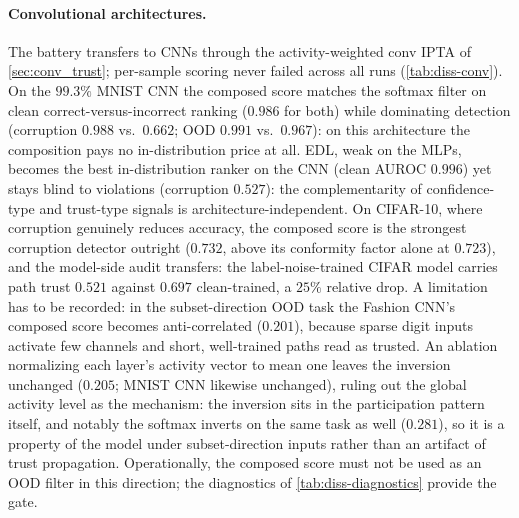 \paragraph*{Convolutional architectures.}
The battery transfers to \acp{CNN} through the activity-weighted conv \ac{IPTA} of \cref{sec:conv_trust}; per-sample scoring never failed across all runs (\cref{tab:diss-conv}). On the $99.3\%$ MNIST \ac{CNN} the composed score matches the softmax filter on clean correct-versus-incorrect ranking ($0.986$ for both) while dominating detection (corruption $0.988$ vs.\ $0.662$; \ac{OOD} $0.991$ vs.\ $0.967$): on this architecture the composition pays no in-distribution price at all. \ac{EDL}, weak on the MLPs, becomes the best in-distribution ranker on the \ac{CNN} (clean AUROC $0.996$) yet stays blind to violations (corruption $0.527$): the complementarity of confidence-type and trust-type signals is architecture-independent. On CIFAR-10, where corruption genuinely reduces accuracy, the composed score is the strongest corruption detector outright ($0.732$, above its conformity factor alone at $0.723$), and the model-side audit transfers: the label-noise-trained CIFAR model carries path trust $0.521$ against $0.697$ clean-trained, a $25\%$ relative drop. A limitation has to be recorded: in the subset-direction \ac{OOD} task the Fashion \ac{CNN}'s composed score becomes anti-correlated ($0.201$), because sparse digit inputs activate few channels and short, well-trained paths read as trusted. An ablation normalizing each layer's activity vector to mean one leaves the inversion unchanged ($0.205$; MNIST \ac{CNN} likewise unchanged), ruling out the global activity level as the mechanism: the inversion sits in the participation pattern itself, and notably the softmax inverts on the same task as well ($0.281$), so it is a property of the model under subset-direction inputs rather than an artifact of trust propagation. Operationally, the composed score must not be used as an \ac{OOD} filter in this direction; the diagnostics of \cref{tab:diss-diagnostics} provide the gate.

